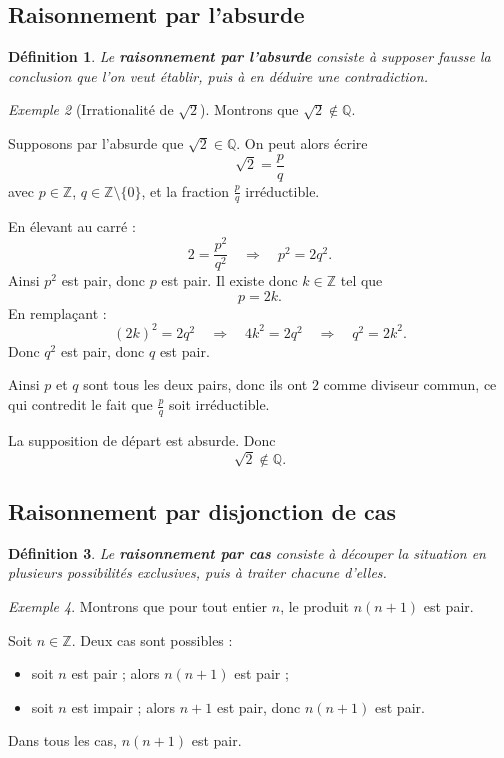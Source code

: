 \documentclass[11pt,a4paper]{article}
\newtheorem{definition}{Définition}[section]
\theoremstyle{remark}
\newtheorem{exemple}[definition]{Exemple}
\newcommand{\Z}{\mathbb{Z}}
\newcommand{\Q}{\mathbb{Q}}
\begin{document}
\subsection{Raisonnement par l’absurde}

\begin{definition}
Le \textbf{raisonnement par l’absurde} consiste à supposer fausse la conclusion que l’on veut établir, puis à en déduire une contradiction.
\end{definition}

\begin{exemple}[Irrationalité de \(\sqrt{2}\)]
Montrons que \(\sqrt{2}\notin \Q\).

Supposons par l’absurde que \(\sqrt{2}\in \Q\). On peut alors écrire
\[
\sqrt{2}=\frac{p}{q}
\]
avec \(p\in\Z\), \(q\in\Z\setminus\{0\}\), et la fraction \(\frac{p}{q}\) irréductible.

En élevant au carré :
\[
2=\frac{p^2}{q^2}
\quad \Longrightarrow \quad
p^2=2q^2.
\]
Ainsi \(p^2\) est pair, donc \(p\) est pair. Il existe donc \(k\in\Z\) tel que
\[
p=2k.
\]
En remplaçant :
\[
(2k)^2=2q^2
\quad \Longrightarrow \quad
4k^2=2q^2
\quad \Longrightarrow \quad
q^2=2k^2.
\]
Donc \(q^2\) est pair, donc \(q\) est pair.

Ainsi \(p\) et \(q\) sont tous les deux pairs, donc ils ont \(2\) comme diviseur commun, ce qui contredit le fait que \(\frac{p}{q}\) soit irréductible.

La supposition de départ est absurde. Donc
\[
\sqrt{2}\notin \Q.
\]
\end{exemple}

\subsection{Raisonnement par disjonction de cas}

\begin{definition}
Le \textbf{raisonnement par cas} consiste à découper la situation en plusieurs possibilités exclusives, puis à traiter chacune d’elles.
\end{definition}

\begin{exemple}
Montrons que pour tout entier \(n\), le produit \(n(n+1)\) est pair.

Soit \(n\in\Z\). Deux cas sont possibles :
\begin{itemize}
    \item soit \(n\) est pair ; alors \(n(n+1)\) est pair ;
    \item soit \(n\) est impair ; alors \(n+1\) est pair, donc \(n(n+1)\) est pair.
\end{itemize}

Dans tous les cas, \(n(n+1)\) est pair.
\end{exemple}
\end{document}
